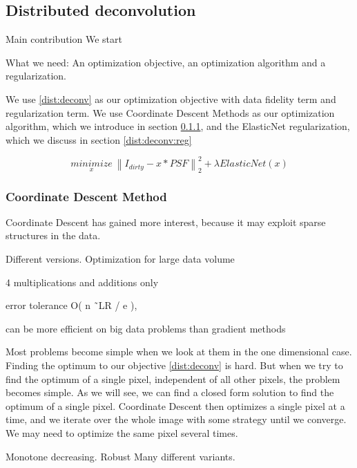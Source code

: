 \subsection{Distributed deconvolution}

Main contribution
We start 

What we need: An optimization objective, an optimization algorithm and a regularization. 

We use \eqref{dist:deconv} as our optimization objective with data fidelity term and regularization term. We use Coordinate Descent Methods as our optimization algorithm, which we introduce in section \ref{dist:deconv:cd}, and the ElasticNet regularization, which we discuss in section \ref{dist:deconv:reg}

\begin{equation}\label{dist:deconv}
\underset{x}{minimize} \: \left \| I_{dirty} - x * PSF \right \|_2^2 + \lambda ElasticNet(x)
\end{equation}



\subsubsection{Coordinate Descent Method}\label{dist:deconv:cd}
Coordinate Descent has gained more interest, because it may exploit sparse structures in the data.

Different versions.
Optimization for large data volume\cite{richtarik2016distributed}

4 multiplications and additions only\cite{richtarik2012efficient}

error tolerance O( n ˜LR / e ), \cite{richtarik2016parallel}

can be more efficient on big data problems than gradient methods \cite{nesterov2012efficiency,nesterov2013gradient}

Most problems become simple when we look at them in the one dimensional case. Finding the optimum to our objective \eqref{dist:deconv} is hard. But when we try to find the optimum of a single pixel, independent of all other pixels, the problem becomes simple. As we will see, we can find a closed form solution to find the optimum of a single pixel.
Coordinate Descent then optimizes a single pixel at a time, and we iterate over the whole image with some strategy until we converge. We may need to optimize the same pixel several times.

Monotone decreasing.
Robust
Many different variants.


